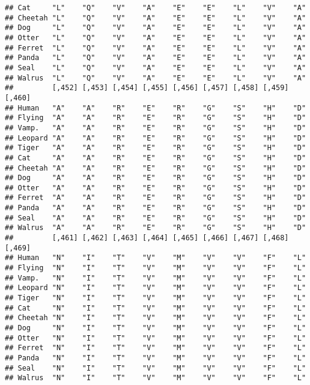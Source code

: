 \documentclass[]{article}
\begin{document}
\begin{verbatim}
## Cat     "L"    "Q"    "V"    "A"    "E"    "E"    "L"    "V"    "A"   
## Cheetah "L"    "Q"    "V"    "A"    "E"    "E"    "L"    "V"    "A"   
## Dog     "L"    "Q"    "V"    "A"    "E"    "E"    "L"    "V"    "A"   
## Otter   "L"    "Q"    "V"    "A"    "E"    "E"    "L"    "V"    "A"   
## Ferret  "L"    "Q"    "V"    "A"    "E"    "E"    "L"    "V"    "A"   
## Panda   "L"    "Q"    "V"    "A"    "E"    "E"    "L"    "V"    "A"   
## Seal    "L"    "Q"    "V"    "A"    "E"    "E"    "L"    "V"    "A"   
## Walrus  "L"    "Q"    "V"    "A"    "E"    "E"    "L"    "V"    "A"   
##         [,452] [,453] [,454] [,455] [,456] [,457] [,458] [,459] [,460]
## Human   "A"    "A"    "R"    "E"    "R"    "G"    "S"    "H"    "D"   
## Flying  "A"    "A"    "R"    "E"    "R"    "G"    "S"    "H"    "D"   
## Vamp.   "A"    "A"    "R"    "E"    "R"    "G"    "S"    "H"    "D"   
## Leopard "A"    "A"    "R"    "E"    "R"    "G"    "S"    "H"    "D"   
## Tiger   "A"    "A"    "R"    "E"    "R"    "G"    "S"    "H"    "D"   
## Cat     "A"    "A"    "R"    "E"    "R"    "G"    "S"    "H"    "D"   
## Cheetah "A"    "A"    "R"    "E"    "R"    "G"    "S"    "H"    "D"   
## Dog     "A"    "A"    "R"    "E"    "R"    "G"    "S"    "H"    "D"   
## Otter   "A"    "A"    "R"    "E"    "R"    "G"    "S"    "H"    "D"   
## Ferret  "A"    "A"    "R"    "E"    "R"    "G"    "S"    "H"    "D"   
## Panda   "A"    "A"    "R"    "E"    "R"    "G"    "S"    "H"    "D"   
## Seal    "A"    "A"    "R"    "E"    "R"    "G"    "S"    "H"    "D"   
## Walrus  "A"    "A"    "R"    "E"    "R"    "G"    "S"    "H"    "D"   
##         [,461] [,462] [,463] [,464] [,465] [,466] [,467] [,468] [,469]
## Human   "N"    "I"    "T"    "V"    "M"    "V"    "V"    "F"    "L"   
## Flying  "N"    "I"    "T"    "V"    "M"    "V"    "V"    "F"    "L"   
## Vamp.   "N"    "I"    "T"    "V"    "M"    "V"    "V"    "F"    "L"   
## Leopard "N"    "I"    "T"    "V"    "M"    "V"    "V"    "F"    "L"   
## Tiger   "N"    "I"    "T"    "V"    "M"    "V"    "V"    "F"    "L"   
## Cat     "N"    "I"    "T"    "V"    "M"    "V"    "V"    "F"    "L"   
## Cheetah "N"    "I"    "T"    "V"    "M"    "V"    "V"    "F"    "L"   
## Dog     "N"    "I"    "T"    "V"    "M"    "V"    "V"    "F"    "L"   
## Otter   "N"    "I"    "T"    "V"    "M"    "V"    "V"    "F"    "L"   
## Ferret  "N"    "I"    "T"    "V"    "M"    "V"    "V"    "F"    "L"   
## Panda   "N"    "I"    "T"    "V"    "M"    "V"    "V"    "F"    "L"   
## Seal    "N"    "I"    "T"    "V"    "M"    "V"    "V"    "F"    "L"   
## Walrus  "N"    "I"    "T"    "V"    "M"    "V"    "V"    "F"    "L"   

\end{verbatim}
\end{document}
